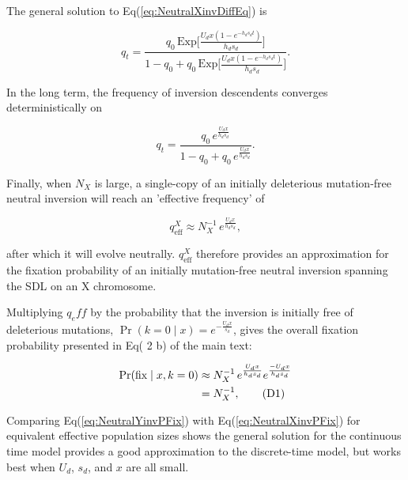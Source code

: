 \documentclass{article}
\newcommand\hl[1]{%
  \bgroup
  \hskip0pt\color{blue!80!black}%
  #1%
  \egroup
}
\newcommand\numberthis{\addtocounter{equation}{1}\tag{\theequation}}
\begin{document}
\noindent The general solution to Eq(\ref{eq:NeutralXinvDiffEq}) is

\begin{equation}\label{eq:NeutralXinvGenSol}
	q_{t} = \frac{q_{0} \, \text{Exp}\big[ \frac{U_d x(1 - e^{-h_d s_d t})}{h_d s_d } \big]} {1 - q_{0} + q_0 \, \text{Exp} \big[ \frac{U_d x(1 - e^{-h_d s_d t})}{h_d s_d } \big]}.
\end{equation} 

\noindent In the long term, the frequency of inversion descendents converges deterministically on 

\begin{equation}\label{eq:NeutralXinvqEff}
	q_{t} = \frac{q_{0} \, e^{\frac{U_d x}{h_d s_d }}} {1 - q_{0} + q_0 \, e^{\frac{U_d x}{h_d s_d }}}.
\end{equation} 

\noindent Finally, when $N_X$ is large, a single-copy of an initially deleterious mutation-free neutral inversion will reach an 'effective frequency' of

\begin{equation}\label{eq:NeutralXinvQEff}
	q^X_{\text{eff}} \approx N^{-1}_X \, e^{\frac{U_d x}{h_d s_d }},
\end{equation} 

\noindent after which it will evolve neutrally. $q^X_{\text{eff}}$ therefore provides an approximation for the fixation probability of an initially mutation-free neutral inversion spanning the SDL on an X chromosome. 

Multiplying $q_eff$ by the probability that the inversion is initially free of deleterious mutations, $\Pr(k = 0 \mid x) = e^{-\frac{U_d x}{s_d}}$, gives the overall fixation probability presented in Eq(\hl{2}b) of the main text:

\begin{align*}\label{eq:NeutralXinvPFix}
		\Pr(\text{fix} \mid x, k = 0) &\approx N^{-1}_X \, e^{\frac{U_d x}{h_d s_d}} e^{\frac{-U_d x}{h_d s_d}} \\
		&= N^{-1}_X, \numberthis
\end{align*}

Comparing Eq(\ref{eq:NeutralYinvPFix}) with Eq(\ref{eq:NeutralXinvPFix}) for equivalent effective population sizes shows the general solution for the continuous time model provides a good approximation to the discrete-time model, but works best when $U_d$, $s_d$, and $x$ are all small. 

\newpage{}
\end{document}
